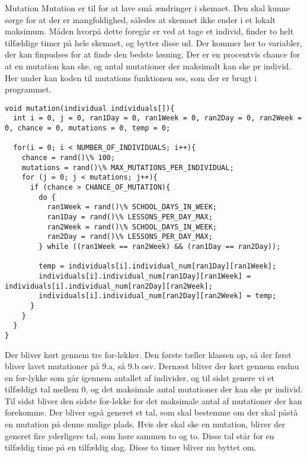 Mutation
Mutation er til for at lave små ændringer i skemaet. Den skal kunne sørge for at der er mangfoldighed, således at skemaet ikke ender i et lokalt maksimum. 
Måden hvorpå dette foregår er ved at tage et individ, finder to helt tilfældige timer på hele skemaet, og bytter disse ud. Der kommer her to variabler, der kan finpudses for at finde den bedste løsning. Der er en procentvis chance for at en mutation kan ske, og antal mutationer der maksimalt kan ske pr individ. 
Her under kan koden til mutations funktionen ses, som der er brugt i programmet.
\begin{lstlisting}
void mutation(individual individuals[]){
  int i = 0, j = 0, ran1Day = 0, ran1Week = 0, ran2Day = 0, ran2Week = 0, chance = 0, mutations = 0, temp = 0;

  for(i = 0; i < NUMBER_OF_INDIVIDUALS; i++){
    chance = rand()\% 100;
    mutations = rand()\% MAX_MUTATIONS_PER_INDIVIDUAL;
    for (j = 0; j < mutations; j++){
      if (chance > CHANCE_OF_MUTATION){
        do {
          ran1Week = rand()\% SCHOOL_DAYS_IN_WEEK;
          ran1Day = rand()\% LESSONS_PER_DAY_MAX;
          ran2Week = rand()\% SCHOOL_DAYS_IN_WEEK;
          ran2Day = rand()\% LESSONS_PER_DAY_MAX;
        } while ((ran1Week == ran2Week) && (ran1Day == ran2Day));
        
        temp = individuals[i].individual_num[ran1Day][ran1Week];
        individuals[i].individual_num[ran1Day][ran1Week] =        individuals[i].individual_num[ran2Day][ran2Week];
        individuals[i].individual_num[ran2Day][ran2Week] = temp;
      }
    }
  }
}
\end{lstlisting}

Der bliver kørt gennem tre for-løkker. Den første tæller klassen op, så der først bliver lavet mutationer på 9.a, så 9.b osv. Dernæst bliver der kørt gennem endnu en for-lykke som går igennem antallet af individer, og til sidst genere vi et tilfældigt tal mellem 0, og det maksimale antal mutationer der kan ske pr individ. Til sidst bliver den sidste for-løkke for det maksimale antal af mutationer der kan forekomme. Der bliver også generet et tal, som skal bestemme om der skal påstå en mutation på denne mulige plads. Hvis der skal ske en mutation, bliver der generet fire yderligere tal, som høre sammen to og to. Disse tal står for en tilfældig time på en tilfældig dag. Disse to timer bliver nu byttet om. 
